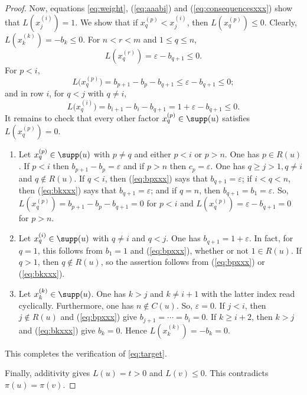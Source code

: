 \documentclass[12pt]{amsart}
\numberwithin{equation}{section}
\let\epsilon\varepsilon
\begin{document}
\begin{proof}
  Now, equations \eqref{eq:weight}, (\ref{eq:aaabi}) and (\ref{eq:consequencesxxx}) show that $L(x_j^{(i)})=1$.  We show that if $x_q^{(p)} < x_j^{(i)}$, then $L(x_q^{(p)}) \leq 0$.  Clearly, $L(x_k^{(k)}) = -b_k \leq 0$.  
 For $n<r<m$ and $1\le q\le n$,
\[
L(x_q^{(r)})=\varepsilon-b_{q+1}\le0.
\]
For $p<i$,
\[
L\bigl(x_q^{(p)}\bigr)
= b_{p+1}-b_{p}-b_{q+1} \le\varepsilon-b_{q+1}\le0;
\]
and in row $i$, for $q<j$ with $q\ne i$,
\[
L\bigl(x_q^{(i)}\bigr)
= b_{i+1}-b_{i}-b_{q+1}
= 1+\varepsilon-b_{q+1}\le0.
\]
It remains to check that every other factor $x_q^{(p)}\in  \supp(u)$ satisfies $L(x_q^{(p)})=0$.
\begin{enumerate}
\item[(i)]
Let $x_q^{(p)}\in \supp(u)$ with $p \neq q$ and either $p<i$ or $p > n$.  One has $p\in R(u)$. If $p<i$  then $b_{p+1}-b_p=\varepsilon$ and if $p>n$ then $c_p=\epsilon$. One has $q\ge j > 1, q\ne i$ and $q\notin R(u)$.  If $q<i$, then (\ref{eq:bpxxx}) says that $b_{q+1} = \varepsilon$; if $i<q<n$, then (\ref{eq:bkxxx}) says that $b_{q+1} = \varepsilon$; and if $q=n$, then $b_{q+1} = b_1 = \varepsilon$.  So,  $L(x_q^{(p)})=b_{p+1}-b_p-b_{q+1}=0$ for $p <i$ and $L(x_q^{(p)})=\varepsilon - b_{q+1}=0$ for $p > n$.



\item[(ii)] Let $x_q^{(i)}\in \supp(u)$ with $q \neq i$ and $q<j$.  One has $b_{q+1}=1+\varepsilon$.  In fact, for $q=1$, this follows from $b_1=1$ and (\ref{eq:bpxxx}), whether or not $1\in R(u)$. If $q>1$, then $q\notin R(u)$, so the assertion follows from (\ref{eq:bpxxx}) or (\ref{eq:bkxxx}). 
\item[(iii)] Let $x_k^{(k)}\in \supp(u)$.
One has $k>j$ and $k\ne i+1$ with the latter index read cyclically.  %
Furthermore, one has $n\notin C(u)$.  So, $\varepsilon=0$.  %
If $j<i$, then $j\notin R(u)$ and (\ref{eq:bpxxx}) give
$b_{j+1}=\cdots=b_i=0$.
If $k\ge i+2$, then $k>j$ and (\ref{eq:bkxxx}) give $b_k=0$.
Hence $L(x_k^{(k)})=-b_k=0$.
\end{enumerate}
This completes the verification of \eqref{eq:target}.

Finally, additivity gives $L(u) = t > 0$ and $L(v) \leq 0$.  This contradicts $\pi(u)=\pi(v)$.
\hspace{0.9cm}
\end{proof}
\end{document}
